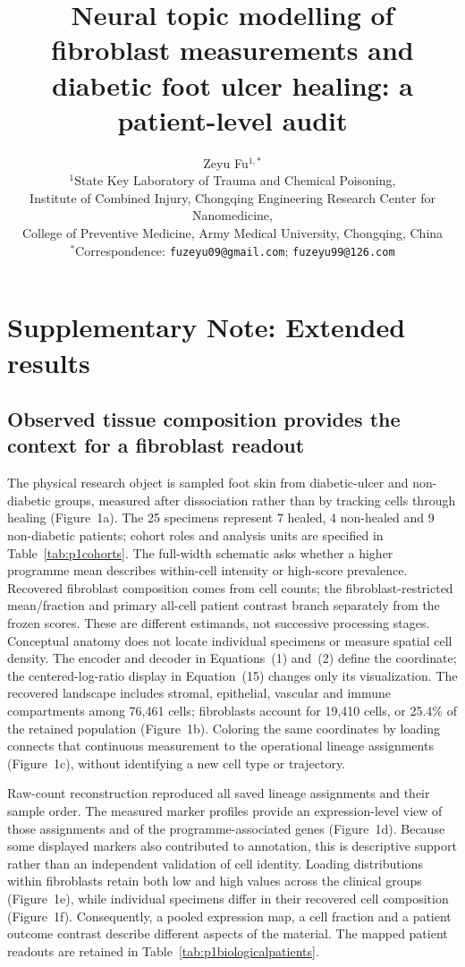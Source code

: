 \documentclass[10pt,a4paper]{article}
\title{Neural topic modelling of fibroblast measurements and diabetic foot ulcer healing: a patient-level audit}
\author{Zeyu Fu$^{1,*}$\\[3pt]\small $^1$State Key Laboratory of Trauma and Chemical Poisoning,\\\small Institute of Combined Injury, Chongqing Engineering Research Center for Nanomedicine,\\\small College of Preventive Medicine, Army Medical University, Chongqing, China\\\small $^*$Correspondence: \texttt{fuzeyu09@gmail.com}; \texttt{fuzeyu99@126.com}}\date{}
\begin{document}
\renewcommand{\thefigure}{S\arabic{figure}}
\maketitle\supplement
\section*{Supplementary Note: Extended results}
\subsection{Observed tissue composition provides the context for a fibroblast readout}




The physical research object is sampled foot skin from diabetic-ulcer and non-diabetic groups, measured after dissociation rather than by tracking cells through healing (Figure~1a\label{call:p1f1}). The 25 specimens represent 7 healed, 4 non-healed and 9 non-diabetic patients; cohort roles and analysis units are specified in Table~\ref{tab:p1cohorts}. The full-width schematic asks whether a higher programme mean describes within-cell intensity or high-score prevalence. Recovered fibroblast composition comes from cell counts; the fibroblast-restricted mean/fraction and primary all-cell patient contrast branch separately from the frozen scores. These are different estimands, not successive processing stages. Conceptual anatomy does not locate individual specimens or measure spatial cell density. The encoder and decoder in Equations~(1) and~(2) define the coordinate; the centered-log-ratio display in Equation~(15) changes only its visualization. The recovered landscape includes stromal, epithelial, vascular and immune compartments among 76,461 cells; fibroblasts account for 19,410 cells, or 25.4\% of the retained population (Figure~1b). Coloring the same coordinates by loading connects that continuous measurement to the operational lineage assignments (Figure~1c), without identifying a new cell type or trajectory.

Raw-count reconstruction reproduced all saved lineage assignments and their sample order. The measured marker profiles provide an expression-level view of those assignments and of the programme-associated genes (Figure~1d). Because some displayed markers also contributed to annotation, this is descriptive support rather than an independent validation of cell identity. Loading distributions within fibroblasts retain both low and high values across the clinical groups (Figure~1e), while individual specimens differ in their recovered cell composition (Figure~1f). Consequently, a pooled expression map, a cell fraction and a patient outcome contrast describe different aspects of the material. The mapped patient readouts are retained in Table~\ref{tab:p1biologicalpatients}.
\end{document}
